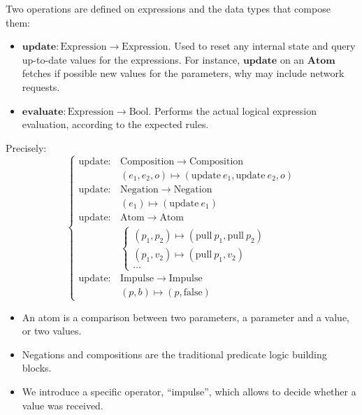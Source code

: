 \documentclass[applsci,article,submit,moreauthors,pdftex,10pt,a4paper]{mdpi}
\begin{document}
Two operations are defined on expressions and the data types that compose them: 

\begin{itemize}
    \item $\mathbf{update}: \mathrm{Expression} \rightarrow \mathrm{Expression}$. Used to reset any internal state and query up-to-date values for the expressions. For instance, $\mathbf{update}$ on an $\mathbf{Atom}$ fetches if possible new values for the parameters, why may include network requests.
    \item $\mathbf{evaluate}: \mathrm{Expression} \rightarrow \mathrm{Bool}$. Performs the actual logical expression evaluation, according to the expected rules. %
\end{itemize}

Precisely:
\[
\begin{cases}
\mathrm{update} : & \mathrm{Composition} \rightarrow \mathrm{Composition} \\ 
& (e_1, e_2, o) \mapsto (\mathrm{update}~e_1, \mathrm{update}~e_2, o) \\
\mathrm{update} : & \mathrm{Negation} \rightarrow \mathrm{Negation} \\
&  (e_1) \mapsto (\mathrm{update}~ e_1) \\
\mathrm{update} :&  \mathrm{Atom} \rightarrow \mathrm{Atom} \\
& \begin{cases}
(p_1, p_2) \mapsto (\mathrm{pull}~p_1, \mathrm{pull}~p_2) \\
(p_1, v_2) \mapsto (\mathrm{pull}~p_1, v_2) \\ 
\dots
\end{cases}\\
\mathrm{update} : & \mathrm{Impulse} \rightarrow \mathrm{Impulse} \\
& (p, b) \mapsto (p, \mathrm{false})
\end{cases}
\] 


\begin{itemize}
    \item An atom is a comparison between two parameters, a parameter and a value, or two values.
    \item Negations and compositions are the traditional predicate logic building blocks.
    \item We introduce a specific operator, ``impulse'', which allows to decide whether a value was received.
\end{itemize}
\end{document}
